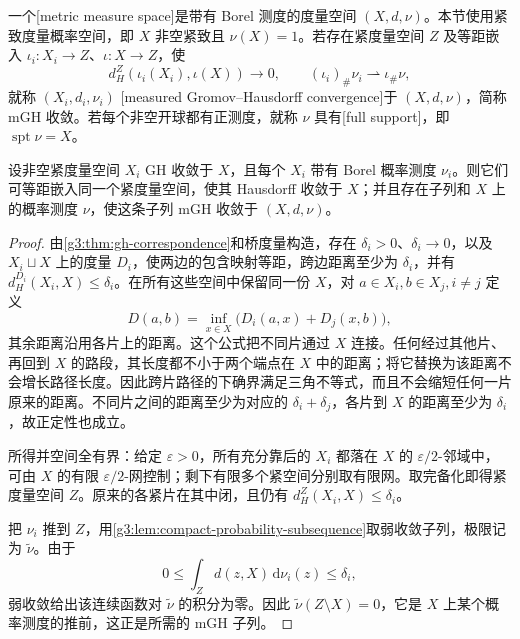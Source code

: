 \begin{definition}\label{g3:def:measured-gh-convergence}
	一个[metric measure space]是带有 Borel 测度的度量空间 \((X,d,\nu)\)。本节使用紧致度量概率空间，即 \(X\) 非空紧致且 \(\nu(X)=1\)。若存在紧度量空间 \(Z\) 及等距嵌入 \(\iota_i:X_i\to Z\)、\(\iota:X\to Z\)，使
	\begin{equation}\label{g3:eq:measured-gh-definition}
		d_H^Z(\iota_i(X_i),\iota(X))\longrightarrow0,
		\qquad (\iota_i)_\#\nu_i\rightharpoonup\iota_\#\nu,
	\end{equation}
	就称 \((X_i,d_i,\nu_i)\) [measured Gromov--Hausdorff convergence]于 \((X,d,\nu)\)，简称 mGH 收敛。若每个非空开球都有正测度，就称 \(\nu\) 具有[full support]，即 \(\operatorname{spt}\nu=X\)。
\end{definition}

\begin{proposition}\label{g3:prop:gh-common-compact-ambient}
	设非空紧度量空间 \(X_i\) GH 收敛于 \(X\)，且每个 \(X_i\) 带有 Borel 概率测度 \(\nu_i\)。则它们可等距嵌入同一个紧度量空间，使其 Hausdorff 收敛于 \(X\)；并且存在子列和 \(X\) 上的概率测度 \(\nu\)，使这条子列 mGH 收敛于 \((X,d,\nu)\)。
\end{proposition}
\begin{proof}
	由\cref{g3:thm:gh-correspondence}和桥度量构造，存在 \(\delta_i>0\)、\(\delta_i\to0\)，以及 \(X_i\sqcup X\) 上的度量 \(D_i\)，使两边的包含映射等距，跨边距离至少为 \(\delta_i\)，并有 \(d_H^{D_i}(X_i,X)\le\delta_i\)。在所有这些空间中保留同一份 \(X\)，对 \(a\in X_i,b\in X_j,i\ne j\) 定义
	\[
		D(a,b)=\inf_{x\in X}\bigl(D_i(a,x)+D_j(x,b)\bigr),
	\]
	其余距离沿用各片上的距离。这个公式把不同片通过 \(X\) 连接。任何经过其他片、再回到 \(X\) 的路段，其长度都不小于两个端点在 \(X\) 中的距离；将它替换为该距离不会增长路径长度。因此跨片路径的下确界满足三角不等式，而且不会缩短任何一片原来的距离。不同片之间的距离至少为对应的 \(\delta_i+\delta_j\)，各片到 \(X\) 的距离至少为 \(\delta_i\)，故正定性也成立。

	所得并空间全有界：给定 \(\varepsilon>0\)，所有充分靠后的 \(X_i\) 都落在 \(X\) 的 \(\varepsilon/2\)-邻域中，可由 \(X\) 的有限 \(\varepsilon/2\)-网控制；剩下有限多个紧空间分别取有限网。取完备化即得紧度量空间 \(Z\)。原来的各紧片在其中闭，且仍有 \(d_H^Z(X_i,X)\le\delta_i\)。

	把 \(\nu_i\) 推到 \(Z\)，用\cref{g3:lem:compact-probability-subsequence}取弱收敛子列，极限记为 \(\widetilde\nu\)。由于
	\[
		0\le\int_Zd(z,X)\,\mathrm d\nu_i(z)\le\delta_i,
	\]
	弱收敛给出该连续函数对 \(\widetilde\nu\) 的积分为零。因此 \(\widetilde\nu(Z\setminus X)=0\)，它是 \(X\) 上某个概率测度的推前，这正是所需的 mGH 子列。
\end{proof}

